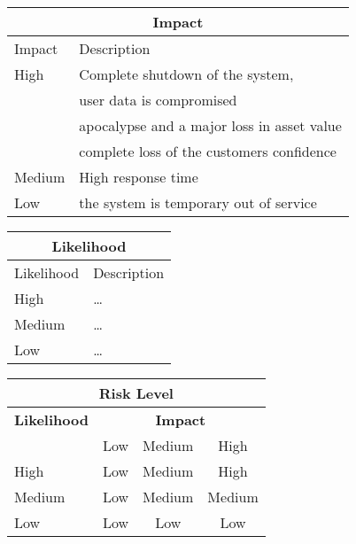 \documentclass{article}
\begin{document}
\begin{center}
\begin{tabular}{|l|l|}
\hline
\multicolumn{2}{|c|}{\bf Impact} \\
\hline
Impact & Description \\
\hline
\hline
High & Complete shutdown of the system, \\
     & user data is compromised \\
     & apocalypse and a major loss in asset value\\
     & complete loss of the customers confidence \\
     
         
\hline
Medium & High response time \\
\hline
Low   & the system is temporary out of service\\
\hline
\end{tabular}
%
%
\begin{tabular}{|l|l|}
\hline
\multicolumn{2}{|c|}{\bf Likelihood} \\
\hline
Likelihood & Description \\
\hline
\hline
High   & \hspace*{20pt}\ldots \\
\hline
Medium & \hspace*{20pt}\ldots \\
\hline
Low   & \hspace*{20pt}\ldots \\
\hline
\end{tabular}
\end{center}

\vspace{5mm}

\begin{center}
\begin{tabular}{|l|c|c|c|}
\hline
\multicolumn{4}{|c|}{{\bf Risk Level}} \\
\hline
{{\bf Likelihood}} & \multicolumn{3}{c|}{{\bf Impact}} \\ %
     & Low & Medium & High \\  \hline
 High & Low & Medium & High  \\
\hline
 Medium & Low & Medium & Medium \\
\hline
 Low & Low & Low & Low \\
\hline
\end{tabular}
\end{center}
\end{document}
